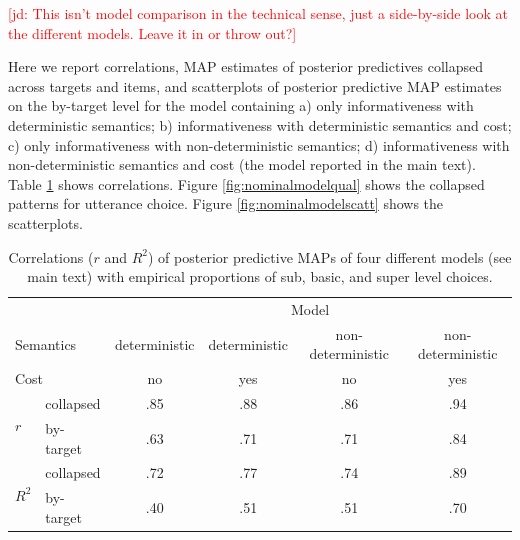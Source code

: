 \documentclass[11pt]{article}
\newcommand{\jd}[1]{\textcolor{Red}{[jd: #1]}}
\newcommand{\tableref}[1]{Table \ref{#1}}
\newcommand{\figref}[1]{Figure \ref{#1}}
\begin{document}
\jd{This isn't model comparison in the technical sense, just a side-by-side look at the different models. Leave it in or throw out?}

Here we report correlations, MAP estimates of posterior predictives collapsed across targets and items, and scatterplots of posterior predictive MAP estimates on the by-target level for the model containing a) only informativeness with deterministic semantics; b) informativeness with deterministic semantics and cost; c) only informativeness with non-deterministic semantics; d) informativeness with non-deterministic semantics and cost (the model reported in the main text). \tableref{tab:nominalmodelcorr} shows correlations. \figref{fig:nominalmodelqual} shows the collapsed patterns for utterance choice. \figref{fig:nominalmodelscatt} shows the scatterplots.

\begin{table}
\centering
\caption{Correlations ($r$ and $R^2$) of posterior predictive MAPs of four different models (see main text) with empirical proportions of sub, basic, and super level choices.}
	\begin{tabular}{l l c c c c}
	\toprule
	& & \multicolumn{4}{c}{Model}\\
	\multicolumn{2}{l}{Semantics}  & deterministic & deterministic & non-deterministic & non-deterministic\\
	\multicolumn{2}{l}{Cost} &  no & yes & no & yes \\
	\midrule
	\multirow{2}{*}{$r$} & collapsed & .85 & .88 & .86 & .94\\
	& by-target & .63 & .71 & .71 & .84\\
	\midrule
	\multirow{2}{*}{$R^2$} & collapsed & .72 & .77 & .74 & .89\\
	& by-target & .40 & .51 & .51 & .70\\
	\bottomrule
	\end{tabular}
	\label{tab:nominalmodelcorr}
\end{table}
\end{document}
